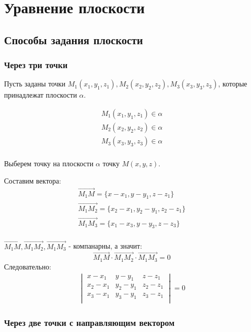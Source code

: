 \section{Уравнение плоскости}

\subsection{Способы задания плоскости}

\subsubsection{Через три точки}

Пусть заданы точки $M_1(x_1, y_1, z_1), M_2(x_2, y_2, z_2), M_3(x_3, y_3, z_3)$, которые принадлежат плоскости $\alpha$. %

\begin{gather*}
  M_1(x_1, y_1, z_1) \in \alpha \\
  M_2(x_2, y_2, z_2) \in \alpha \\
  M_3(x_3, y_3, z_3) \in \alpha \\
\end{gather*}

Выберем точку на плоскости $\alpha$ точку $M(x, y, z)$.

Составим вектора:
\begin{gather*}
  \overrightarrow{M_1 M} = \{x - x_1, y - y_1, z - z_1\} \\
  \overrightarrow{M_1 M_2} = \{x_2 - x_1, y_2 - y_1, z_2 - z_1\} \\ 
  \overrightarrow{M_1 M_3} = \{x_1 - x_3, y - y_3, z - z_3\} \\
\end{gather*}

$\overrightarrow{M_1 M}, \overrightarrow{M_1 M_2}, \overrightarrow{M_1 M_3}$ - компанарны, а значит: \[
\overrightarrow{M_1 M} \cdot \overrightarrow{M_1 M_2} \cdot \overrightarrow{M_1 M_3} = 0
\] 
Следовательно:
\begin{gather*}
  \boxed{
  \begin{vmatrix}
    x - x_1 & y - y_1 & z - z_1 \\
    x_2 - x_1 & y_2 - y_1 & z_2 - z_1 \\
    x_3 - x_1 & y_3 - y_1 & z_3 - z_1 \\
  \end{vmatrix} = 0}
\end{gather*}

\subsubsection{Через две точки с направляющим вектором}

